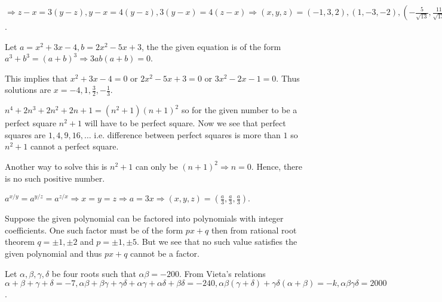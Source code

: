   $\Rightarrow z - x = 3(y - z), y - x = 4(y - z), 3(y - x) = 4(z - x)\Rightarrow (x, y, z) = (-1, 3, 2),
  (1, -3, -2), \left(-\frac{5}{\sqrt{13}}, \frac{11}{\sqrt{13}}, \frac{7}{\sqrt{13}}\right),
  \left(\frac{5}{\sqrt{13}}, -\frac{11}{\sqrt{13}}, -\frac{7}{\sqrt{13}}\right)$.
\item Let $a = x^2 + 3x - 4, b = 2x^2 - 5x + 3$, the the given equation is of the form $a^3 + b^3 = (a +
  b)^3 \Rightarrow 3ab(a + b) = 0$.

  This implies that $x^2 + 3x - 4 = 0$ or $2x^2 - 5x + 3 = 0$ or $3x^2 - 2x - 1 = 0$. Thus solutions are $x
  = -4, 1, \frac{3}{2}, -\frac{1}{3}$.
\item $n^4 + 2n^3 + 2n^2 + 2n + 1 = (n^2 + 1)(n + 1)^2$ so for the given number to be a perfect square $n^2
  + 1$ will have to be perfect square. Now we see that perfect squares are $1, 4, 9, 16, \ldots$
  i.e. difference between perfect squares is more than $1$ so $n^2 + 1$ cannot a perfect square.

  Another way to solve this is $n^2 + 1$ can only be $(n + 1)^2\Rightarrow n = 0$. Hence, there is no such
  positive number.
\item $a^{x/y} = a^{y/z} = a^{z/x} \Rightarrow x = y = z \Rightarrow a = 3x \Rightarrow (x, y, z) =
  \left(\frac{a}{3}, \frac{a}{3}, \frac{a}{3}\right)$.
\item Suppose the given polynomial can be factored into polynomials with integer coefficients. One such
  factor must be of the form $px + q$ then from rational root theorem $q = \pm1, \pm2$ and $p = \pm1,
  \pm5$. But we see that no such value satisfies the given polynomial and thus $px + q$ cannot be a factor.
\item Let $\alpha, \beta, \gamma, \delta$ be four roots such that $\alpha\beta = -200$. From Vieta's
  relations $\alpha + \beta + \gamma + \delta = -7, \alpha\beta + \beta\gamma + \gamma\delta + \alpha\gamma
  + \alpha\delta + \beta\delta = -240, \alpha\beta(\gamma + \delta) + \gamma\delta(\alpha + \beta) = -k,
  \alpha\beta\gamma\delta = 2000$.

